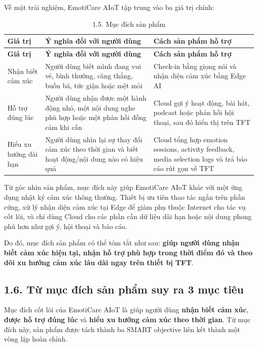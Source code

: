 \documentclass[12pt,a4paper]{article}
\begin{document}
Về mặt trải nghiệm, EmotiCare AIoT tập trung vào ba giá trị chính:


\begin{center}
\begin{longtable}{|P{0.25\textwidth}|P{0.32\textwidth}|P{0.33\textwidth}|}
\caption{1.5. Mục đích sản phẩm}\\
\hline
\textbf{Giá trị} & \textbf{Ý nghĩa đối với người dùng} & \textbf{Cách sản phẩm hỗ trợ} \\
\hline
\endfirsthead
\hline
\textbf{Giá trị} & \textbf{Ý nghĩa đối với người dùng} & \textbf{Cách sản phẩm hỗ trợ} \\
\hline
\endhead
Nhận biết cảm xúc & Người dùng biết mình đang vui vẻ, bình thường, căng thẳng, buồn bã, tức giận hoặc mệt mỏi & Check-in bằng giọng nói và nhận diện cảm xúc bằng Edge AI \\
\hline
Hỗ trợ đúng lúc & Người dùng nhận được một hành động nhỏ, một nội dung nghe phù hợp hoặc một phản hồi đồng cảm khi cần & Cloud gợi ý hoạt động, bài hát, podcast hoặc phản hồi hội thoại, sau đó hiển thị trên TFT \\
\hline
Hiểu xu hướng dài hạn & Người dùng nhìn lại sự thay đổi cảm xúc theo thời gian và biết hoạt động/nội dung nào có hiệu quả & Cloud tổng hợp emotion sessions, activity feedback, media selection logs và trả báo cáo rút gọn về TFT \\
\hline
\end{longtable}
\end{center}

Từ góc nhìn sản phẩm, mục đích này giúp EmotiCare AIoT khác với một ứng dụng nhật ký cảm xúc thông thường. Thiết bị ưu tiên thao tác ngắn trên phần cứng, xử lý nhận diện cảm xúc tại Edge để giảm phụ thuộc Internet cho tác vụ cốt lõi, và chỉ dùng Cloud cho các phần cần dữ liệu dài hạn hoặc nội dung phong phú hơn như gợi ý, hội thoại và báo cáo.


Do đó, mục đích sản phẩm có thể tóm tắt như sau: \textbf{giúp người dùng nhận biết cảm xúc hiện tại, nhận hỗ trợ phù hợp trong thời điểm đó và theo dõi xu hướng cảm xúc lâu dài ngay trên thiết bị TFT}.


\subsection*{1.6. Từ mục đích sản phẩm suy ra 3 mục tiêu}

Mục đích cốt lõi của EmotiCare AIoT là giúp người dùng \textbf{nhận biết cảm xúc}, \textbf{được hỗ trợ đúng lúc} và \textbf{hiểu xu hướng cảm xúc theo thời gian}. Từ mục đích này, sản phẩm được tách thành ba SMART objective liên kết thành một vòng lặp hoàn chỉnh.
\end{document}
